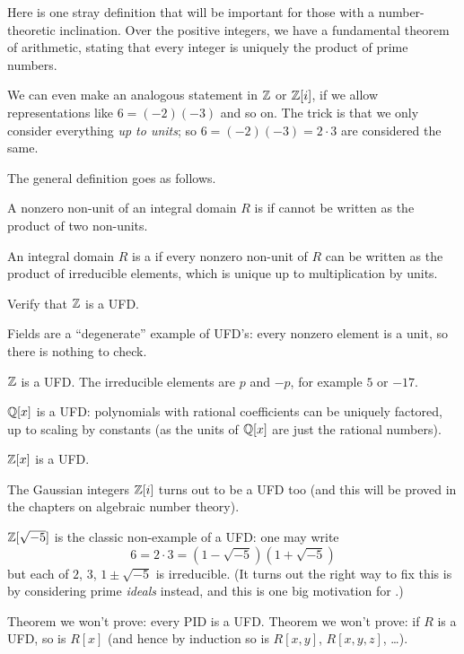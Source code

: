 Here is one stray definition that will be important
for those with a number-theoretic inclination.
Over the positive integers, we have a fundamental theorem of arithmetic,
stating that every integer is uniquely the product of prime numbers.

We can even make an analogous statement in $\mathbb Z$ or $\mathbb Z[i]$,
if we allow representations like $6 = (-2)(-3)$ and so on.
The trick is that we only consider everything \emph{up to units};
so $6 = (-2)(-3) = 2 \cdot 3$ are considered the same.

The general definition goes as follows.
\begin{definition}
	A nonzero non-unit of an integral domain $R$ is
	 if cannot be written as the product of two non-units.

	An integral domain $R$ is a 
	if every nonzero non-unit of $R$ can be written
	as the product of irreducible elements,
	which is unique up to multiplication by units.
\end{definition}
\begin{ques}
	Verify that $\mathbb Z$ is a UFD.
\end{ques}

\begin{example}
	\listhack
	\begin{enumerate}[(a)]
		\ii Fields are a ``degenerate'' example of UFD's:
		every nonzero element is a unit,
		so there is nothing to check.

		\ii $\mathbb Z$ is a UFD.
		The irreducible elements are $p$ and $-p$,
		for example $5$ or $-17$.

		\ii $\mathbb Q[x]$ is a UFD:
		polynomials with rational coefficients
		can be uniquely factored, up to scaling by constants
		(as the units of $\mathbb Q[x]$ are just the rational numbers).

		\ii $\mathbb Z[x]$ is a UFD.

		\ii The Gaussian integers $\mathbb Z[i]$ turns out to be a UFD too
		(and this will be proved in the chapters on algebraic number theory).

		\ii $\mathbb Z[\sqrt{-5}]$ is the classic non-example of a UFD:
		one may write
		\[ 6 = 2 \cdot 3 = \left( 1-\sqrt{-5} \right)
			\left( 1+\sqrt{-5} \right) \]
		but each of $2$, $3$, $1 \pm \sqrt{-5}$ is irreducible.
		(It turns out the right way to fix this is
		by considering prime \emph{ideals} instead,
		and this is one big motivation for .)

		\ii Theorem we won't prove: every PID is a UFD.
		\ii Theorem we won't prove: if $R$ is a UFD,
		so is $R[x]$ (and hence by induction so is
		$R[x,y]$, $R[x,y,z]$, \dots).
	\end{enumerate}
\end{example}



